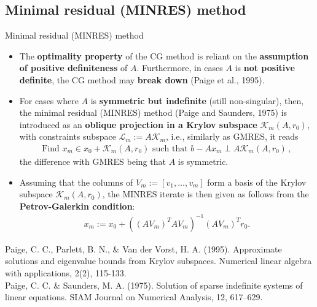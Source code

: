 \documentclass[t,usepdftitle=false]{beamer}
\begin{document}
\subsection{Minimal residual (MINRES) method}
\begin{frame}{Minimal residual (MINRES) method}
\begin{itemize}
\item The \textbf{optimality property} of the CG method is reliant on the \textbf{assumption of positive definiteness} of $A$.
Furthermore, in cases $A$ is \textbf{not positive definite}, the CG method may \textbf{break down} (Paige et al., 1995).
\item[] For cases where $A$ is \textbf{symmetric but indefinite} (still non-singular), then, the minimal residual (MINRES) method (Paige and Saunders, 1975) is introduced as an \textbf{oblique projection in a Krylov subspace} $\mathcal{K}_m(A,r_0)$, with constraints subspace $\mathcal{L}_m:=A\mathcal{K}_m$, i.e., similarly as GMRES, it reads
\begin{align}\label{eq:minres}
\boxed{\text{Find }x_m\in x_0+\mathcal{K}_m(A,r_0)\text{ such that }
b-Ax_m\perp A\mathcal{K}_m(A,r_0)}\,,
\end{align}
the difference with GMRES being that $A$ is symmetric.
\item[] Assuming that the columns of $V_m:=[v_1,\dots,v_m]$ form a basis of the Krylov subspace $\mathcal{K}_m(A,r_0)$, the MINRES iterate is then given as follows from the \textbf{Petrov-Galerkin condition}:
\begin{align*}
x_m:=x_0+((AV_m)^TAV_m)^{-1}(AV_m)^Tr_0.
\end{align*}
\end{itemize}
\tiny{Paige, C. C., Parlett, B. N., \& Van der Vorst, H. A. (1995). Approximate solutions and eigenvalue bounds from Krylov subspaces. Numerical linear algebra with applications, 2(2), 115-133.}\tinyskip\\
\tiny{Paige, C. C. \& Saunders, M. A. (1975). Solution of sparse indefinite systems of linear equations. SIAM
Journal on Numerical Analysis, 12, 617–629.}
\end{frame}
\end{document}
